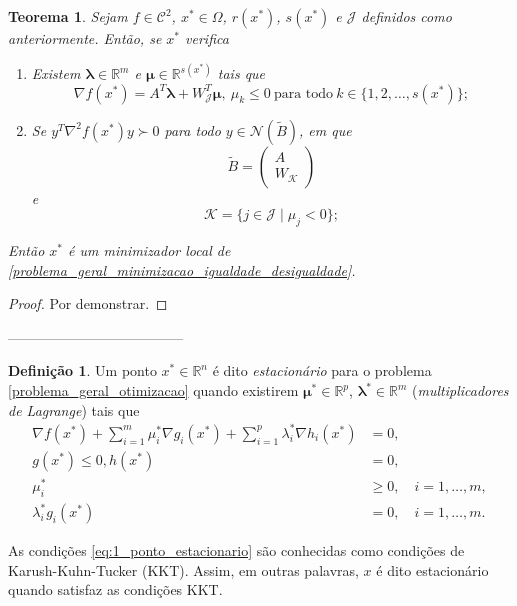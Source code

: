 \documentclass[12pt,a4paper]{scrartcl}
\def\RR{\mathds{R}}
\newtheorem{teo}{Teorema}
\theoremstyle{definition}%
\newtheorem{defi}{Definição}
\begin{document}
\begin{teo} \label{teo:condicao_suficiente_igualdade_desigualdade}
Sejam $f\in \mathcal{C}^{2}$, $x^{*} \in \Omega$, $r(x^{*})$, $s(x^{*})$ e $\mathcal{J}$ definidos como anteriormente. Então, se $x^{*}$ verifica
\begin{enumerate}
	\item[(i)] Existem $\boldsymbol{\lambda} \in \RR^{m}$ e $\boldsymbol{\mu} \in \RR^{s(x^{*})}$ tais que 
	\[
	\nabla f(x^{*}) = A^{T}\boldsymbol{\lambda} + W^{T}_{\mathcal{J}} \boldsymbol{\mu}, \ \mu_{k} \leq 0 \ \text{para todo} \ k\in \{ 1,2, \ldots , s(x^{*}) \} ;
	\]
	\item[(ii)] Se $y^{T}\nabla^{2} f(x^{*})y \succ 0$ para todo $y\in \mathcal{N}(\tilde{B})$, em que
	\[
	\tilde{B} = \left( \begin{array}{cc} A \\ W_{\mathcal{K}} \end{array} \right) 
	\]
	e
	\[
	\mathcal{K} = \{ j\in \mathcal{J} \mid \mu_{j} <0 \};
	\]
\end{enumerate}
Então $x^{*}$ é um minimizador local de \eqref{problema_geral_minimizacao_igualdade_desigualdade}.
\end{teo}
\begin{proof}
Por demonstrar.
\end{proof}


--------------------------------------

\begin{defi} 
Um ponto $x^{*} \in \RR^{n} $ é dito \emph{estacionário} para o problema \eqref{problema_geral_otimizacao} quando existirem $\boldsymbol{\mu}^{*} \in \RR^{p} $, $\boldsymbol{\lambda}^{*} \in \RR^{m} $ (\emph{multiplicadores de Lagrange}) tais que
\begin{align} \label{eq:1_ponto_estacionario}
\nabla f(x^{*})+\sum_{i=1}^{m} \mu_{i}^{*} \nabla g_{i}(x^{*})+\sum_{i=1}^{p} \lambda_{i}^{*} \nabla h_{i}(x^{*}) & =0, \\ 
g(x^{*}) \leq 0, h(x^{*}) & =0,  \label{eq:2_ponto_estacionario} \\ 
\mu_{i}^{*} & \geq 0, \quad i= 1, \ldots , m,   \label{eq:3_ponto_estacionario} \\ 
\lambda_{i}^{*} g_{i}(x^{*}) & =0, \quad i= 1, \ldots , m.  \label{eq:4_ponto_estacionario}
\end{align}


\end{defi}
As condições \eqref{eq:1_ponto_estacionario} são conhecidas como condições de Karush-Kuhn-Tucker (KKT). Assim, em outras palavras, $x$ é dito estacionário quando satisfaz as condições KKT. 
\end{document}
